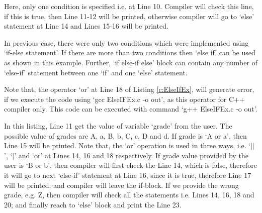 \begin{explanation}
	Here, only one condition is specified i.e. at Line 10. Compiler will check this line, if this is true, then Line 11-12 will be printed, otherwise compiler will go to `else' statement at Line 14 and Lines 15-16 will be printed.
\end{explanation}


\begin{pyExmp}
	In previous case, there were only two conditions which were implemented using `if-else statement'. If there are more than two conditions then `else if' can be used as shown in this example. Further, `if else-if else' block can contain any number of `else-if' statement between one `if' and one `else' statement.  
\end{pyExmp}

\begin{noNumBox}
	Note that, the operator `or' at Line 18 of Listing \ref{c:ElseIfEx}, will generate error, if we execute the code using `gcc ElseIFEx.c -o out', as this operator for C++ compiler only. This code can be executed with command `g++ ElseIFEx.c -o out'. 
\end{noNumBox}

\begin{explanation}
	In this listing, Line 11 get the value of variable `grade' from the user. The possible value of grades are A, a, B, b,  C, c, D and d. If grade is `A or a', then Line 15 will be printed. Note that, the `or' operation is used in three ways, i.e. `$||$', `$|$' and `or' at Lines 14, 16 and 18 respectively.  If grade value provided by the user is `B or b', then compiler will first check the Line 14, which is false, therefore it will go to next `else-if' statement at Line 16, since it is true, therefore Line 17 will be printed; and compiler will leave the if-block. If we provide the wrong grade, e.g. Z, then compiler will check all the statements i.e. Lines 14, 16, 18 and 20; and finally reach to `else' block and print the Line 23. 
\end{explanation}



